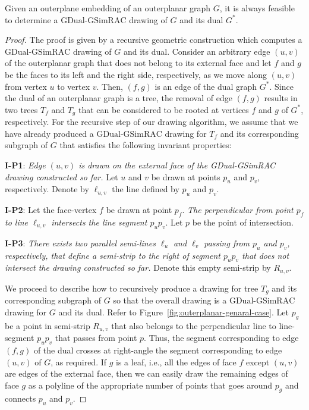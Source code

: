 \documentclass{llncs}
\newcommand{\GDual}{\mathrm{GDual\text{-}GSimRAC}}
\begin{document}
\begin{theorem}
\label{thm:outerplanar-dual}Given an outerplane embedding of an
outerplanar graph $G$, it is always feasible to determine a $\GDual$
drawing of $G$ and its dual $G^*$.
\end{theorem}

\begin{proof}
The proof is given by a recursive geometric construction which
computes a $\GDual$ drawing of $G$ and its dual. Consider an
arbitrary edge $(u,v)$ of the outerplanar graph that does not belong
to its external face and let $f$ and $g$ be the faces to its left
and the right side, respectively, as we move along $(u,v)$ from
vertex $u$ to vertex $v$. Then, $(f,g)$ is an edge of the dual graph
$G^*$. Since the dual of an outerplanar graph is a tree, the removal
of edge $(f,g)$ results in two trees $T_f$ and $T_g$ that can be
considered to be rooted at vertices $f$ and $g$ of $G^*$,
respectively. For the recursive step of our drawing algorithm, we
assume that we have already produced a $\GDual$ drawing for $T_f$
and its corresponding subgraph of $G$ that satisfies the following
invariant properties:
\begin{description}
\item{\textbf{I-P1}:} \emph{Edge $(u,v)$ is drawn on the external face of the GDual-GSimRAC drawing constructed so
far.} Let $u$ and $v$ be drawn at points $p_u$ and $p_v$,
respectively. Denote by $\ell_{u,v}$ the line defined by $p_u$ and
$p_v$.
\item{\textbf{I-P2}:} Let the face-vertex $f$ be drawn at point $p_f$. \emph{The perpendicular from point $p_f$ to line $\ell_{u,v}$
intersects the line segment $p_up_v$}. Let $p$ be the point of
intersection.
\item{\textbf{I-P3}:} \emph{There exists two parallel semi-lines $\ell_u$ and $\ell_v$
passing from $p_u$ and $p_v$, respectively, that define a semi-strip
to the right of segment $p_up_v$ that does not intersect the drawing
constructed so far.} Denote this empty semi-strip by $R_{u,v}$.
\end{description}

We proceed to describe how to recursively produce a drawing for tree
$T_g$ and its corresponding subgraph of $G$ so that the overall
drawing is a $\GDual$ drawing for $G$ and its dual. Refer to
Figure~\ref{fig:outerplanar-genaral-case}. Let $p_g$ be a point in
semi-strip $R_{u,v}$ that also belongs to the perpendicular line to
line-segment $p_up_v$ that passes from point $p$. Thus, the segment
corresponding to edge $(f,g)$ of the dual crosses at right-angle the
segment corresponding to edge $(u,v)$ of $G$, as required. If $g$ is
a leaf, i.e., all the edges of face $f$ except $(u,v)$ are edges of
the external face, then we can easily draw the remaining edges of
face $g$ as a polyline of the appropriate number of points that goes
around $p_g$ and connects $p_u$ and $p_v$.


\end{proof}
\end{document}
